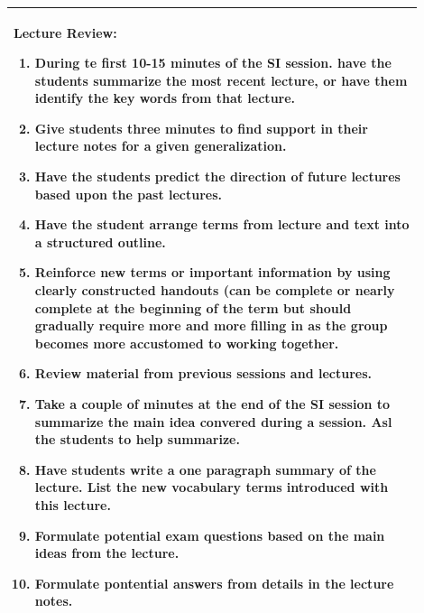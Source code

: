 \documentclass{article}
\begin{document}
\begin{tabular}{|p{0.9\linewidth}|}
\hline
\vspace{0.2cm}
\textbf{Lecture Review:}
\begin{enumerate}
\item During te first 10-15 minutes of the SI session. have the students summarize the most recent lecture, or have them identify the key words from that lecture.
\item Give students three minutes to find support in their lecture notes for a given generalization.
\item Have the students predict the direction of future lectures based upon the past lectures.
\item Have the student arrange terms from lecture and text into a structured outline.
\item Reinforce new terms or important information by using clearly constructed handouts (can be complete or nearly complete at the beginning of the term but should gradually require more and more filling in as the group becomes more accustomed to working together.
\item Review material from previous sessions and lectures.
\item Take a couple of minutes at the end of the SI session to summarize the main idea convered during a session. Asl the students to help summarize.
\item Have students write a one paragraph summary of the lecture. List the new vocabulary terms introduced with this lecture.
\item Formulate potential exam questions based on the main ideas from the lecture.
\item Formulate pontential answers from details in the lecture notes.
\end{enumerate} \\
\hline
\end{tabular}
\end{document}
